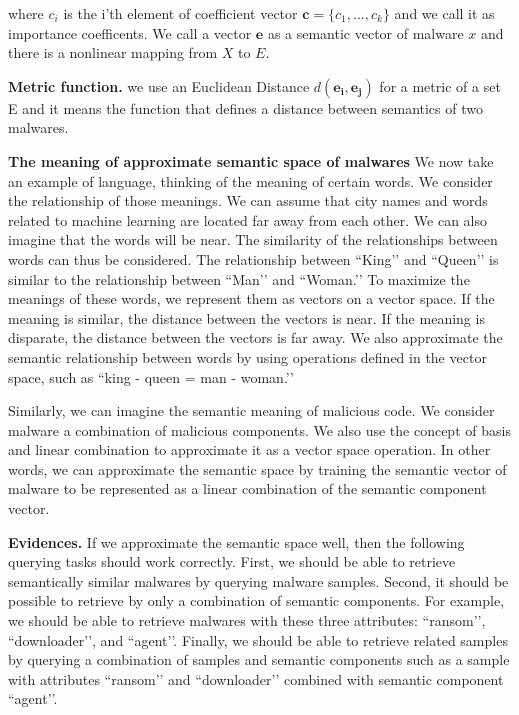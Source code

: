 where $c_i$ is the i’th element of coefficient vector $ \mathbf{c} = \{c_1, ... , c_k\}$ and we call it as importance coefficents.
We call a vector $\mathbf{e}$ as a semantic vector of malware $x$ and there is a nonlinear mapping from $X$ to $E$. 

\textbf{Metric function. }
we use an Euclidean Distance $d(\mathbf{e_i}, \mathbf{e_j})$ for a metric of a set E and it means the function that defines a distance between  semantics of two malwares. 

\textbf{The meaning of approximate semantic space of malwares}
We now take an example of language, thinking of the meaning of certain words. We consider the relationship of those meanings. We can assume that city names and words related to machine learning are located far away from each other. We can also imagine that the words will be near. The similarity of the relationships between words can thus be considered. The relationship between ``King’’ and ``Queen’’ is similar to the relationship between ``Man’’ and ``Woman.’’ To maximize the meanings of these words, we represent them as vectors on a vector space. If the meaning is similar, the distance between the vectors is near. If the meaning is disparate, the distance between the vectors is far away. We also approximate the semantic relationship between words by using operations defined in the vector space, such as ``king - queen = man - woman.’’


Similarly, we can imagine the semantic meaning of malicious code. We consider malware a combination of malicious components. We also use the concept of basis and linear combination to approximate it as a vector space operation. In other words, we can approximate the semantic space by training the semantic vector of malware to be represented as a linear combination of the semantic component vector.


\textbf{Evidences. } 
If we approximate the semantic space well, then the following querying tasks should work correctly. First, we should be able to retrieve semantically similar malwares by querying malware samples. Second, it should be possible to retrieve by only a combination of semantic components. For example, we should be able to retrieve malwares with these three attributes: ``ransom’’, ``downloader’’, and ``agent’’. Finally, we should be able to retrieve related samples by querying a combination of samples and semantic components such as a sample with attributes ``ransom’’ and ``downloader’’ combined with semantic component ``agent’’.


